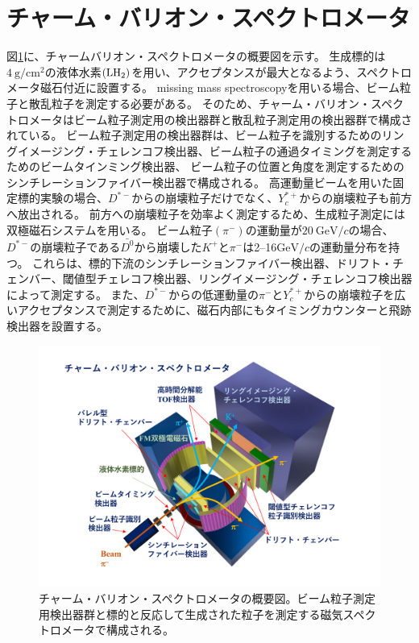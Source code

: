 \section{チャーム・バリオン・スペクトロメータ}
図\ref{spectrometer}に、チャームバリオン・スペクトロメータの概要図を示す。
生成標的は$\SI{4}{\g / \cm^2}$の液体水素$(\rm{LH_2})$を用い、アクセプタンスが最大となるよう、スペクトロメータ磁石付近に設置する。
missing mass spectroscopyを用いる場合、ビーム粒子と散乱粒子を測定する必要がある。
そのため、チャーム・バリオン・スペクトロメータはビーム粒子測定用の検出器群と散乱粒子測定用の検出器群で構成されている。
ビーム粒子測定用の検出器群は、ビーム粒子を識別するためのリングイメージング・チェレンコフ検出器、ビーム粒子の通過タイミングを測定するためのビームタインミング検出器、
ビーム粒子の位置と角度を測定するためのシンチレーションファイバー検出器で構成される。
高運動量ビームを用いた固定標的実験の場合、$D^{*-}$からの崩壊粒子だけでなく、$Y_c^{*+}$からの崩壊粒子も前方へ放出される。
前方への崩壊粒子を効率よく測定するため、生成粒子測定には双極磁石システムを用いる。
ビーム粒子$(\pi^-)$の運動量が$\SI{20}{\GeV/c}$の場合、$D^{*-}$の崩壊粒子である$\bar{D^0}$から崩壊した$K^+$と$\pi^-$は2--16\space$\si{\GeV/c}$の運動量分布を持つ。
これらは、標的下流のシンチレーションファイバー検出器、ドリフト・チェンバー、閾値型チェレコフ検出器、リングイメージング・チェレンコフ検出器によって測定する。
また、$D^{*-}$からの低運動量の$\pi^-$と$Y_c^{*+}$からの崩壊粒子を広いアクセプタンスで測定するために、磁石内部にもタイミングカウンターと飛跡検出器を設置する。


\begin{figure}[htbp]
  \label{spectrometer}
  \centering
  \includegraphics[width=15cm]{images/chapter1/spectrometer.pdf}
  \caption{チャーム・バリオン・スペクトロメータの概要図。ビーム粒子測定用検出器群と標的と反応して生成された粒子を測定する磁気スペクトロメータで構成される。}
\end{figure}